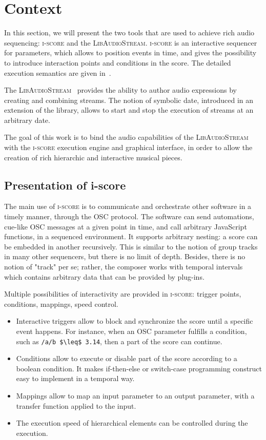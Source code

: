 \documentclass{article}
\newcommand*{\LibAudioStream}{\textsc{LibAudioStream}\xspace}
\newcommand*{\iscore}{\textsc{i-score}\xspace}
\begin{document}
\section{Context}
In this section, we will present the two tools that are used to achieve 
rich audio sequencing: \iscore and the \LibAudioStream.
\iscore is an interactive sequencer for parameters, which allows to position events 
in time, and gives the possibility to introduce interaction points and 
conditions in the score.
The detailed execution semantics are given in~\cite{celerier2015ossia}.

The \LibAudioStream~\cite{letzlibaudiostream} provides the ability to author audio expressions
by creating and combining streams. The notion of symbolic date, introduced in an extension of the library,
allows to start and stop the execution of streams at an arbitrary date.

The goal of this work is to bind the audio capabilities of the \LibAudioStream 
with the \iscore execution engine and graphical interface, in order to allow 
the creation of rich hierarchic and interactive musical pieces.

\subsection{Presentation of i-score}
The main use of \iscore is to communicate and orchestrate other software in a timely manner, 
through the OSC protocol.
The software can send automations, cue-like OSC messages at a given point in time, and call arbitrary JavaScript functions, in a sequenced environment.
It supports arbitrary nesting: a score can be embedded in another recursively.
This is similar to the notion of group tracks in many other sequencers, but 
there is no limit of depth. 
Besides, there is no notion of "track" per se; rather, the composer works with 
temporal intervals which contains arbitrary data that can be provided by plug-ins.

Multiple possibilities of interactivity are provided in \iscore: trigger points, conditions, 
mappings, speed control.
\begin{itemize}
    \item Interactive triggers allow to block and synchronize the score until a specific event happens.
    For instance, when an OSC parameter fulfills a condition, such as  \lstinline[mathescape]!/a/b $\leq$ 3.14!, then 
    a part of the score can continue.
    \item Conditions allow to execute or disable part of the score according to a boolean condition.
    It makes if-then-else or switch-case programming construct easy to implement in a temporal way.
    \item Mappings allow to map an input parameter to an output parameter, with a transfer function applied to the input.
    \item The execution speed of hierarchical elements can be controlled during the execution.
\end{itemize}
\end{document}

